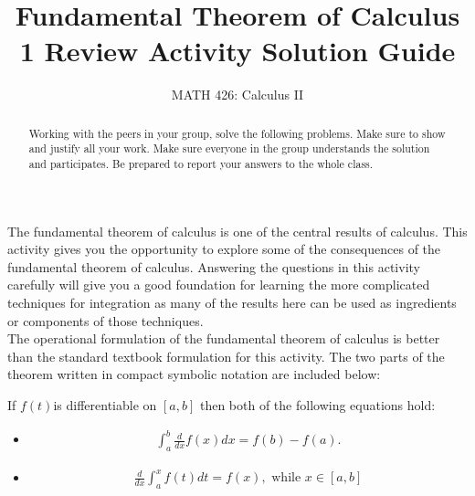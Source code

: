 \documentclass{ximera}
\title{Fundamental Theorem of Calculus 1 Review Activity Solution Guide}
\author{MATH 426: Calculus II}
\begin{document}
\begin{abstract}
   Working with the peers in your group, solve the following problems. Make sure to show and justify all your work. Make sure everyone in the group understands the solution and participates. Be prepared to report your answers to the whole class. 
\end{abstract}
\maketitle

The fundamental theorem of calculus is one of the central results of calculus. This activity gives you the opportunity to explore some of the consequences of the fundamental theorem of calculus. Answering the questions in this activity carefully will give you a good foundation for learning the more complicated techniques for integration as many of the results here can be used as ingredients or components of those techniques.\\

The operational formulation of the fundamental theorem of calculus is better than the standard textbook formulation for this activity. The two parts of the theorem written in compact symbolic notation are included below:

If $f(t)$is differentiable on $[a,b]$ then both of the following equations hold:

\begin{itemize}
\item \begin{align}
	\int_{a}^b\frac{d}{dx}f(x)dx  = f(b)-f(a). \nonumber\end{align}
\item \begin{align}
	\frac{d}{dx}\int_{a}^x f(t)dt = f(x), \text{ while } x \in [a,b] \nonumber\end{align}
\end{itemize}
\end{document}
